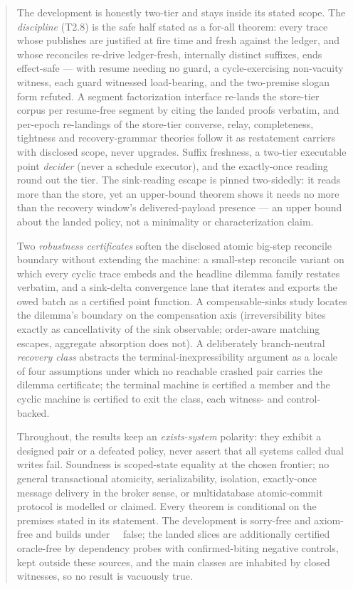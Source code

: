 \documentclass[11pt,a4paper]{article}
\begin{document}
\begin{abstract}
  The development is honestly two-tier and stays inside its stated scope. The
  \emph{discipline} (T2.8) is the safe half stated as a for-all theorem: every
  trace whose publishes are justified at fire time and fresh against the ledger,
  and whose reconciles re-drive ledger-fresh, internally distinct suffixes, ends
  effect-safe --- with resume needing no guard, a cycle-exercising non-vacuity
  witness, each guard witnessed load-bearing, and the two-premise slogan form
  refuted. A segment factorization interface re-lands the store-tier corpus per
  resume-free segment by citing the landed proofs verbatim, and per-epoch
  re-landings of the store-tier converse, relay, completeness, tightness and
  recovery-grammar theories follow it as restatement carriers with disclosed
  scope, never upgrades. Suffix freshness, a two-tier executable point
  \emph{decider} (never a schedule executor), and the exactly-once reading round
  out the tier. The sink-reading escape is pinned two-sidedly: it reads more than
  the store, yet an upper-bound theorem shows it needs no more than the recovery
  window's delivered-payload presence --- an upper bound about the landed policy,
  not a minimality or characterization claim.

  Two \emph{robustness certificates} soften the disclosed atomic big-step
  reconcile boundary without extending the machine: a small-step reconcile
  variant on which every cyclic trace embeds and the headline dilemma family
  restates verbatim, and a sink-delta convergence lane that iterates and exports
  the owed batch as a certified point function. A compensable-sinks study locates
  the dilemma's boundary on the compensation axis (irreversibility bites exactly
  as cancellativity of the sink observable; order-aware matching escapes,
  aggregate absorption does not). A deliberately branch-neutral \emph{recovery
  class} abstracts the terminal-inexpressibility argument as a locale of four
  assumptions under which no reachable crashed pair carries the dilemma
  certificate; the terminal machine is certified a member and the cyclic machine
  is certified to exit the class, each witness- and control-backed.

  Throughout, the results keep an \emph{exists-system} polarity: they exhibit a
  designed pair or a defeated policy, never assert that all systems called dual
  writes fail. Soundness is scoped-state equality at the chosen frontier; no
  general transactional atomicity, serializability, isolation, exactly-once
  message delivery in the broker sense, or multidatabase atomic-commit protocol
  is modelled or claimed. Every theorem is conditional on the premises stated in
  its statement. The development is sorry-free and axiom-free and builds under
  ~\isa{=}~false; the
  landed slices are additionally certified oracle-free by dependency probes with
  confirmed-biting negative controls, kept outside these sources, and the main
  classes are inhabited by closed witnesses, so no result is vacuously true.
\end{abstract}

\tableofcontents

\newpage


\end{document}
